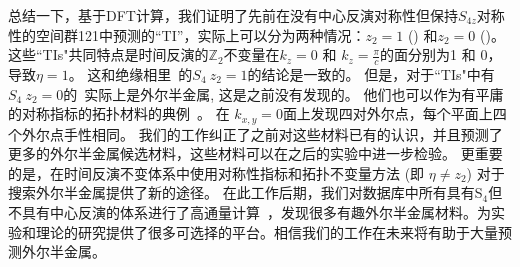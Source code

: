 总结一下，基于DFT计算，我们证明了先前在没有中心反演对称性但保持$S_{4z} $对称性的空间群121中预测的``TI''，实际上可以分为两种情况：$z_2=1 $ (\tii) 和$z_2=0$ (\wsm)。
这些``TIs"共同特点是时间反演的$\mathbb Z_2$不变量在$k_z=0$ 和 $k_z=\frac{\pi}{c}$的面分别为1 和 0，导致$\eta=1$。
这和绝缘相里\tii~的$S_4~z_2=1$的结论是一致的。
但是，对于``TIs"中有$S_4~z_2=0$的\wsm~实际上是外尔半金属, 这是之前没有发现的。
他们也可以作为有平庸的对称指标的拓扑材料的典例~\citep{song2017,wangprl2019}。
在 $k_{x,y}=0$面上发现四对外尔点，每个平面上四个外尔点手性相同。
我们的工作纠正了之前对这些材料已有的认识，并且预测了更多的外尔半金属候选材料，这些材料可以在之后的实验中进一步检验。
更重要的是，在时间反演不变体系中使用对称性指标和拓扑不变量方法 (即 $\eta\neq z_2$) 对于搜索外尔半金属提供了新的途径。
在此工作后期，我们对数据库中所有具有S$_4$但不具有中心反演的体系进行了高通量计算~\citep{tobedone2019}，发现很多有趣外尔半金属材料。为实验和理论的研究提供了很多可选择的平台。相信我们的工作在未来将有助于大量预测外尔半金属。
\ \\



